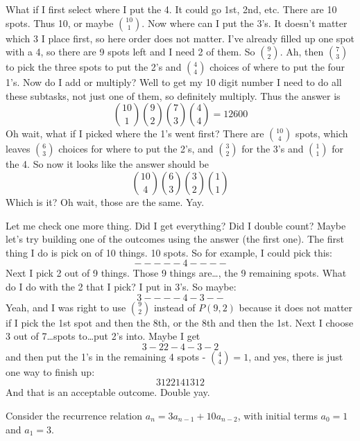 \documentclass[10pt]{exam}
\begin{document}
\begin{questions}
\begin{solution}
What if I first select where I put the 4.  It could go 1st, 2nd, etc.  There are 10 spots.  Thus 10, or maybe ${10 \choose 1}$.  Now where can I put the 3's.  It doesn't matter which 3 I place first, so here order does not matter.  I've already filled up one spot with a 4, so there are 9 spots left and I need 2 of them.  So ${9 \choose 2}$.  Ah, then ${7 \choose 3}$ to pick the three spots to put the 2's and ${4 \choose 4}$ choices of where to put the four 1's.  Now do I add or multiply?  Well to get my 10 digit number I need to do all these subtasks, not just one of them, so definitely multiply.  Thus the answer is
\[{10 \choose 1}{9 \choose 2}{7 \choose 3}{4 \choose 4} = 12600\]
Oh wait, what if I picked where the 1's went first?  There are ${10 \choose 4}$ spots, which leaves ${6 \choose 3}$ choices for where to put the 2's, and ${3 \choose 2}$ for the 3's and ${1 \choose 1}$ for the 4.  So now it looks like the answer should be
\[{10 \choose 4}{6 \choose 3}{3 \choose 2}{1 \choose 1}\]
Which is it?  Oh wait, those are the same.  Yay.

Let me check one more thing.  Did I get everything?  Did I double count?  Maybe let's try building one of the outcomes using the answer (the first one).  The first thing I do is pick on of 10 things.  10 spots.  So for example, I could pick this:
\[- - - - - ~ 4 - - - -\]
Next I pick 2 out of 9 things.  Those 9 things are\ldots, the 9 remaining spots.  What do I do with the 2 that I pick?  I put in 3's.  So maybe:
\[3 - - - - ~ 4 - 3 - -\]
Yeah, and I was right to use ${9 \choose 2}$ instead of $P(9,2)$ because it does not matter if I pick the 1st spot and then the 8th, or the 8th and then the 1st.  Next I choose 3 out of 7\ldots spots to\ldots put 2's into.  Maybe I get
\[3 - 2 2 - 4 - 3 - 2\]
and then put the 1's in the remaining 4 spots - ${4 \choose 4} = 1$, and yes, there is just one way to finish up:
\[3 1 22141312\]
And that is an acceptable outcome.  Double yay.
\end{solution}


\question Consider the recurrence relation $a_n = 3a_{n-1} + 10a_{n-2}$, with initial terms $a_0 = 1$ and $a_1= 3$.
  \begin{solution}
  \begin{parts}

\end{parts}
\end{solution}
\end{questions}
\end{document}
